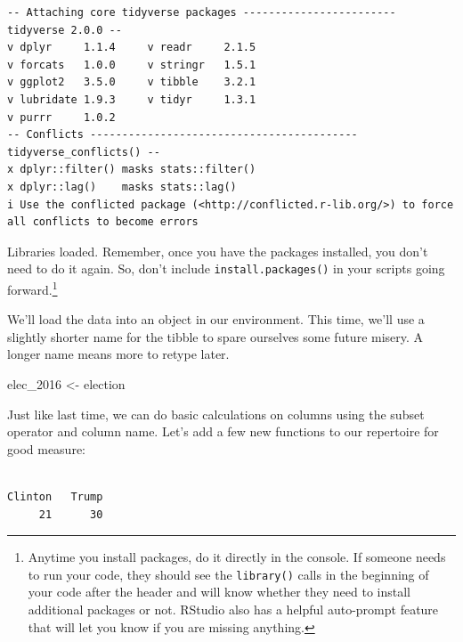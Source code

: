 \documentclass[
  letterpaper,
]{book}
\newenvironment{Shaded}{\begin{snugshade}}{\end{snugshade}}
\newcommand{\CommentTok}[1]{\textcolor[rgb]{0.37,0.37,0.37}{#1}}
\newcommand{\FunctionTok}[1]{\textcolor[rgb]{0.28,0.35,0.67}{#1}}
\newcommand{\NormalTok}[1]{\textcolor[rgb]{0.00,0.23,0.31}{#1}}
\newcommand{\OtherTok}[1]{\textcolor[rgb]{0.00,0.23,0.31}{#1}}
\newcommand{\SpecialCharTok}[1]{\textcolor[rgb]{0.37,0.37,0.37}{#1}}
\begin{document}
\begin{verbatim}
-- Attaching core tidyverse packages ------------------------ tidyverse 2.0.0 --
v dplyr     1.1.4     v readr     2.1.5
v forcats   1.0.0     v stringr   1.5.1
v ggplot2   3.5.0     v tibble    3.2.1
v lubridate 1.9.3     v tidyr     1.3.1
v purrr     1.0.2     
-- Conflicts ------------------------------------------ tidyverse_conflicts() --
x dplyr::filter() masks stats::filter()
x dplyr::lag()    masks stats::lag()
i Use the conflicted package (<http://conflicted.r-lib.org/>) to force all conflicts to become errors
\end{verbatim}

Libraries loaded. Remember, once you have the packages installed, you
don't need to do it again. So, don't include \texttt{install.packages()}
in your scripts going forward.\footnote{Anytime you install packages, do
  it directly in the console. If someone needs to run your code, they
  should see the \texttt{library()} calls in the beginning of your code
  after the header and will know whether they need to install additional
  packages or not. RStudio also has a helpful auto-prompt feature that
  will let you know if you are missing anything.}

We'll load the data into an object in our environment. This time, we'll
use a slightly shorter name for the tibble to spare ourselves some
future misery. A longer name means more to retype later.

\begin{Shaded}
\begin{Highlighting}[]
\NormalTok{elec\_2016 }\OtherTok{\textless{}{-}}\NormalTok{ election}
\end{Highlighting}
\end{Shaded}

Just like last time, we can do basic calculations on columns using the
subset operator and column name. Let's add a few new functions to our
repertoire for good measure:

\begin{Shaded}
\end{Shaded}

\begin{verbatim}

Clinton   Trump 
     21      30 
\end{verbatim}
\end{document}
